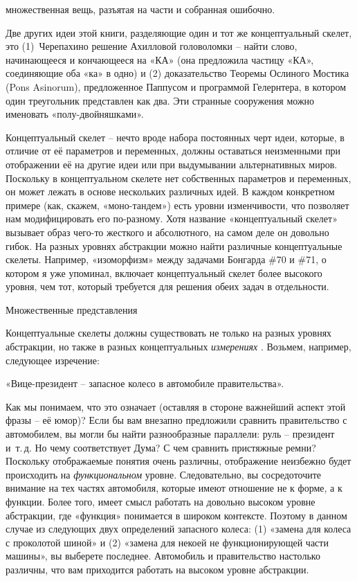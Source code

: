 \documentclass[../main.tex]{subfiles}
\begin{document}
множественная вещь, разъятая на части и собранная ошибочно.

Две других идеи этой книги, разделяющие один и тот же концептуальный скелет, это (1)~Черепахино решение Ахилловой головоломки \--- найти слово, начинающееся и кончающееся на «КА» (она предложила частицу «КА», соединяющие оба «ка» в одно) и (2) доказательство Теоремы Ослиного Мостика (Pons Asinorum), предложенное Паппусом и программой Гелернтера, в котором один треугольник представлен как два. Эти странные сооружения можно именовать «полу-двойняшками».

Концептуальный скелет \--- нечто вроде набора постоянных черт идеи, которые, в отличие от её параметров и переменных, должны оставаться неизменными при отображении её на другие идеи или при выдумывании альтернативных миров. Поскольку в концептуальном скелете нет собственных параметров и переменных, он может лежать в основе нескольких различных идей. В каждом конкретном примере (как, скажем, «моно-тандем») есть уровни изменчивости, что позволяет нам модифицировать его по-разному. Хотя название «концептуальный скелет» вызывает образ чего-то жесткого и абсолютного, на самом деле он довольно гибок. На разных уровнях абстракции можно найти различные концептуальные скелеты. Например, «изоморфизм» между задачами Бонгарда \#70 и \#71, о котором я уже упоминал, включает концептуальный скелет более высокого уровня, чем тот, который требуется для решения обеих задач в отдельности.

Множественные представления

Концептуальные скелеты должны существовать не только на разных уровнях абстракции, но также в разных концептуальных \emph{измерениях} . Возьмем, например, следующее изречение:

«Вице-президент \--- запасное колесо в автомобиле правительства».

Как мы понимаем, что это означает (оставляя в стороне важнейший аспект этой фразы \--- её юмор)? Если бы вам внезапно предложили сравнить правительство с автомобилем, вы могли бы найти разнообразные параллели: руль \--- президент и~т.\,д. Но чему соответствует Дума? С чем сравнить пристяжные ремни? Поскольку отображаемые понятия очень различны, отображение неизбежно будет происходить на \emph{функциональном} уровне. Следовательно, вы сосредоточите внимание на тех частях автомобиля, которые имеют отношение не к форме, а к функции. Более того, имеет смысл работать на довольно высоком уровне абстракции, где «функция» понимается в широком контексте. Поэтому в данном случае из следующих двух определений запасного колеса: (1) «замена для колеса с проколотой шиной» и (2) «замена для некоей не функционирующей части машины», вы выберете последнее. Автомобиль и правительство настолько различны, что вам приходится работать на высоком уровне абстракции.
\end{document}
